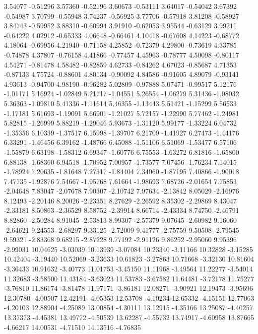 {3.54077 -0.51296
3.57360 -0.52196
3.60673 -0.53111
3.64017 -0.54042
3.67392 -0.54987
3.70799 -0.55948
3.74237 -0.56925
3.77706 -0.57918
3.81208 -0.58927
3.84743 -0.59952
3.88310 -0.60994
3.91910 -0.62053
3.95544 -0.63129
3.99211 -0.64222
4.02912 -0.65333
4.06648 -0.66461
4.10418 -0.67608
4.14223 -0.68772
4.18064 -0.69956
4.21940 -0.71158
4.25852 -0.72379
4.29800 -0.73619
4.33785 -0.74878
4.37807 -0.76158
4.41866 -0.77457
4.45963 -0.78777
4.50098 -0.80117
4.54271 -0.81478
4.58482 -0.82859
4.62733 -0.84262
4.67023 -0.85687
4.71353 -0.87133
4.75724 -0.88601
4.80134 -0.90092
4.84586 -0.91605
4.89079 -0.93141
4.93613 -0.94700
4.98190 -0.96282
5.02809 -0.97888
5.07471 -0.99517
5.12176 -1.01171
5.16924 -1.02849
5.21717 -1.04551
5.26554 -1.06279
5.31436 -1.08032
5.36363 -1.09810
5.41336 -1.11614
5.46355 -1.13443
5.51421 -1.15299
5.56533 -1.17181
5.61693 -1.19091
5.66901 -1.21027
5.72157 -1.22990
5.77462 -1.24981
5.82815 -1.26999
5.88219 -1.29046
5.93673 -1.31120
5.99177 -1.33224
6.04732 -1.35356
6.10339 -1.37517
6.15998 -1.39707
6.21709 -1.41927
6.27473 -1.44176
6.33291 -1.46456
6.39162 -1.48766
6.45088 -1.51106
6.51069 -1.53477
6.57106 -1.55879
6.63198 -1.58312
6.69347 -1.60776
6.75553 -1.63272
6.81816 -1.65800
6.88138 -1.68360
6.94518 -1.70952
7.00957 -1.73577
7.07456 -1.76234
7.14015 -1.78924
7.20635 -1.81648
7.27317 -1.84404
7.34060 -1.87195
7.40866 -1.90018
7.47735 -1.92876
7.54667 -1.95768
7.61664 -1.98693
7.68726 -2.01654
7.75853 -2.04648
7.83047 -2.07678
7.90307 -2.10742
7.97634 -2.13842
8.05029 -2.16976
8.12493 -2.20146
8.20026 -2.23351
8.27629 -2.26592
8.35302 -2.29869
8.43047 -2.33181
8.50863 -2.36529
8.58752 -2.39914
8.66714 -2.43334
8.74750 -2.46791
8.82860 -2.50284
8.91045 -2.53813
8.99307 -2.57379
9.07645 -2.60982
9.16060 -2.64621
9.24553 -2.68297
9.33125 -2.72009
9.41777 -2.75759
9.50508 -2.79545
9.59321 -2.83368
9.68215 -2.87228
9.77192 -2.91126
9.86252 -2.95060
9.95396 -2.99031
10.04625 -3.03039
10.13939 -3.07084
10.23340 -3.11166
10.32828 -3.15285
10.42404 -3.19440
10.52069 -3.23633
10.61823 -3.27863
10.71668 -3.32130
10.81604 -3.36433
10.91632 -3.40773
11.01753 -3.45150
11.11968 -3.49564
11.22277 -3.54014
11.32683 -3.58500
11.43184 -3.63023
11.53783 -3.67582
11.64481 -3.72178
11.75277 -3.76810
11.86174 -3.81478
11.97171 -3.86181
12.08271 -3.90921
12.19473 -3.95696
12.30780 -4.00507
12.42191 -4.05353
12.53708 -4.10234
12.65332 -4.15151
12.77063 -4.20103
12.88904 -4.25089
13.00854 -4.30111
13.12915 -4.35166
13.25087 -4.40257
13.37373 -4.45381
13.49772 -4.50539
13.62287 -4.55732
13.74917 -4.60958
13.87665 -4.66217
14.00531 -4.71510
14.13516 -4.76835
}
